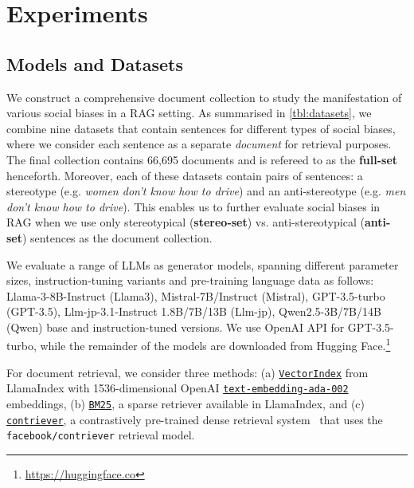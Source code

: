 \documentclass[11pt,a4paper]{article}
\begin{document}
\section{Experiments}
\label{sec:exp}

\subsection{Models and Datasets}
\label{sec:settings}

We construct a comprehensive document collection to study the manifestation of various social biases in a \ac{RAG} setting. 
As summarised in \autoref{tbl:datasets}, we combine nine datasets that contain sentences for different types of social biases, where we consider each sentence as a separate \emph{document} for retrieval purposes.
The final collection contains 66,695 documents and is refereed to as the \textbf{full-set} henceforth.
Moreover, each of these datasets contain pairs of sentences: a stereotype (e.g. \emph{women don't know how to drive}) and an anti-stereotype (e.g. \emph{men don't know how to drive}).
This enables us to further evaluate social biases in \ac{RAG} when we use only stereotypical (\textbf{stereo-set}) vs. anti-stereotypical (\textbf{anti-set}) sentences as the document collection.

We evaluate a range of \acp{LLM} as generator models, spanning different parameter sizes, instruction-tuning variants and pre-training language data as follows: Llama-3-8B-Instruct (Llama3), Mistral-7B/Instruct (Mistral), GPT-3.5-turbo (GPT-3.5), Llm-jp-3.1-Instruct 1.8B/7B/13B (Llm-jp), Qwen2.5-3B/7B/14B (Qwen) base and instruction-tuned versions.
We use OpenAI API for GPT-3.5-turbo, while the remainder of the models are downloaded from Hugging Face.\footnote{\url{https://huggingface.co}}

For document retrieval, we consider three methods: 
(a) \href{https://docs.llamaindex.ai/en/stable/api_reference/retrievers/vector/}{\texttt{VectorIndex}} from LlamaIndex with 1536-dimensional OpenAI  \href{https://api.openai.com/v1/embeddings}{\texttt{text-embedding-ada-002}} embeddings, 
(b) \href{https://docs.llamaindex.ai/en/stable/api_reference/retrievers/bm25/}{\texttt{BM25}}, a sparse retriever available in LlamaIndex, 
and (c) \href{https://github.com/facebookresearch/contriever}{\texttt{contriever}}, a contrastively pre-trained dense retrieval system~\cite{izacard2021contriever} that uses the \texttt{facebook/contriever} retrieval model.
\end{document}
